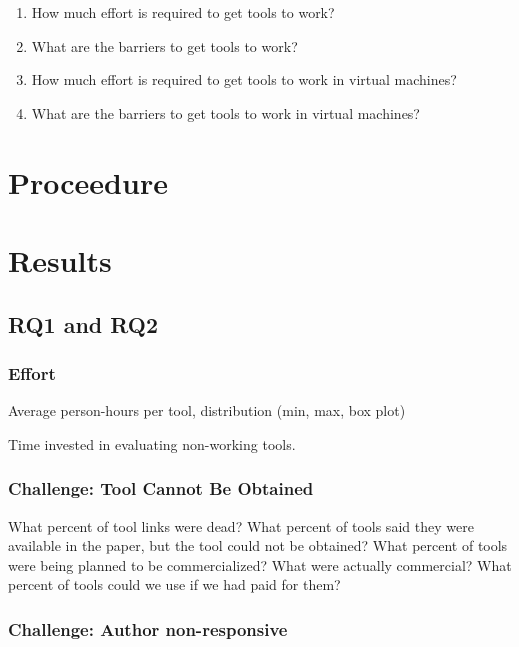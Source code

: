 \documentclass{sig-alternate-05-2015}
\begin{document}
\begin{enumerate}
  \item How much effort is required to get tools to work?
  \item What are the barriers to get tools to work?
  \item How much effort is required to get tools to work in virtual machines?
  \item What are the barriers to get tools to work in virtual machines?
\end{enumerate}

\section{Proceedure}

\section{Results}

\subsection{RQ1 and RQ2}

\subsubsection{Effort}

Average person-hours per tool, distribution (min, max, box plot)

Time invested in evaluating non-working tools.

\subsubsection{Challenge: Tool Cannot Be Obtained}

What percent of tool links were dead?
What percent of tools said they were available in the paper, but the tool could not be obtained?
What percent of tools were being planned to be commercialized? What were actually commercial?
What percent of tools could we use if we had paid for them?

\subsubsection{Challenge: Author non-responsive}

\end{document}
